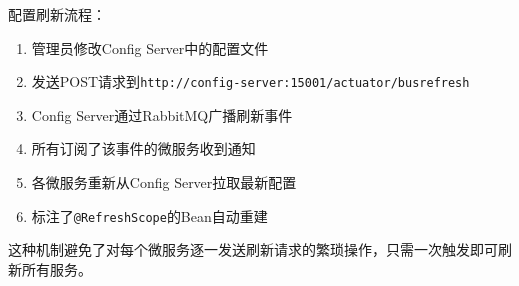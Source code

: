 配置刷新流程：
\begin{enumerate}
	\item 管理员修改Config Server中的配置文件
	\item 发送POST请求到\verb|http://config-server:15001/actuator/busrefresh|
	\item Config Server通过RabbitMQ广播刷新事件
	\item 所有订阅了该事件的微服务收到通知
	\item 各微服务重新从Config Server拉取最新配置
	\item 标注了\verb|@RefreshScope|的Bean自动重建
\end{enumerate}

这种机制避免了对每个微服务逐一发送刷新请求的繁琐操作，只需一次触发即可刷新所有服务。
